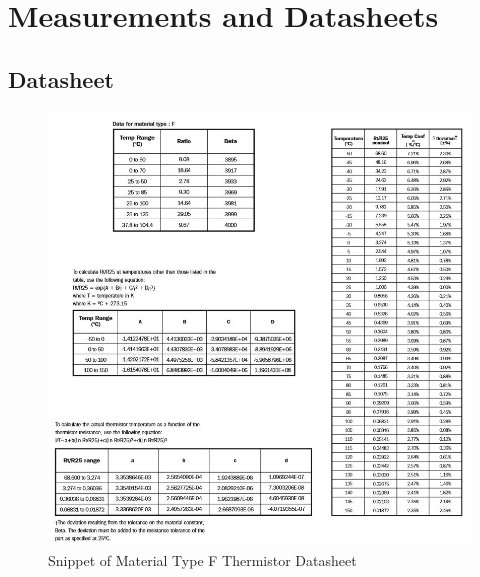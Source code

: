 \chapter{Measurements and Datasheets} 

\section{Datasheet}

\begin{figure}[H]
	\centering
	\includegraphics[width=1.05\linewidth]{thermistordatasheet.jpg}
	\caption{Snippet of Material Type F Thermistor Datasheet \cite{thermistor}}
	\label{thermistordatasheet}
\end{figure}